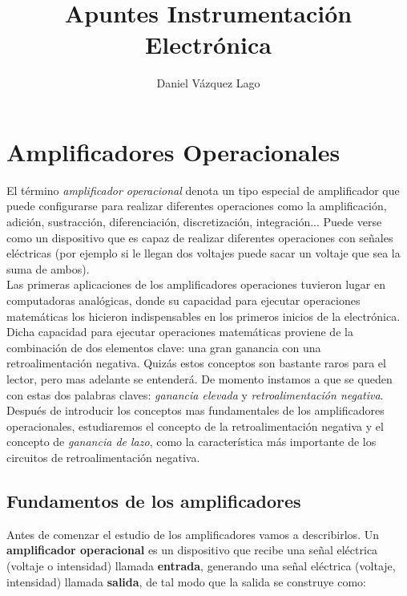 \documentclass[12pt,a4paper]{article}
\author{Daniel Vázquez Lago}
\title{Apuntes Instrumentación Electrónica}
\numberwithin{equation}{section}
\numberwithin{figure}{section}
\begin{document}
\maketitle

\newpage

\tableofcontents

\newpage

\section{Amplificadores Operacionales}

El término \textit{amplificador operacional} denota un tipo especial de amplificador que puede configurarse para realizar diferentes operaciones como la amplificación, adición, sustracción, diferenciación, discretización, integración... Puede verse como un dispositivo que es capaz de realizar diferentes operaciones con señales eléctricas (por ejemplo si le llegan dos voltajes puede sacar un voltaje que sea la suma de ambos). \\

Las primeras aplicaciones de los amplificadores operaciones tuvieron lugar en computadoras analógicas, donde su capacidad para ejecutar operaciones matemáticas los hicieron indispensables en los primeros inicios de la electrónica. \\
 
Dicha capacidad para ejecutar operaciones matemáticas proviene de la combinación de dos elementos clave: una gran ganancia con una retroalimentación negativa. Quizás estos conceptos son bastante raros para el lector, pero mas adelante se entenderá. De momento instamos a que se queden con estas dos palabras claves: \textit{ganancia elevada} y \textit{retroalimentación negativa}. \\

Después de introducir los conceptos mas fundamentales de los amplificadores operacionales, estudiaremos el concepto de la retroalimentación negativa y el concepto de \textit{ganancia de lazo}, como la característica más importante de los circuitos de retroalimentación negativa.   

\subsection{Fundamentos de los amplificadores}

Antes de comenzar el estudio de los amplificadores vamos a describirlos. Un \textbf{amplificador operacional} es un dispositivo que recibe una señal eléctrica (voltaje o intensidad) llamada \textbf{entrada}, generando una señal eléctrica (voltaje, intensidad) llamada \textbf{salida}, de tal modo que la salida se construye como:
\end{document}

